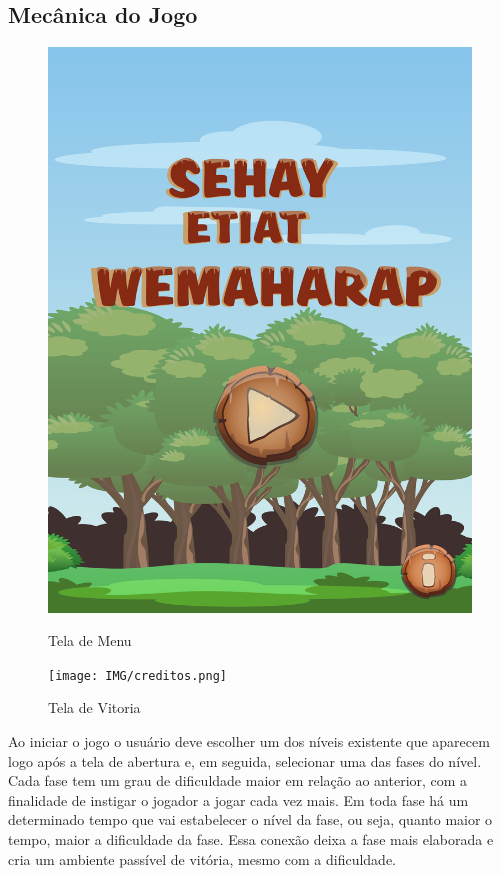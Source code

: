 \documentclass[12pt]{article}
\begin{document}
	
	\subsection{Mecânica do Jogo}
\begin{figure}[!htb]
	\centering
	\includegraphics[width=\linewidth]{IMG/menu.png}
	\caption{Tela de Menu}\label{fig:menu}
	\endminipage \hspace{0.5cm}
	\texttt{[image: IMG/creditos.png]}
	\caption{Tela de Vitoria}\label{fig:creditos}
	\endminipage
\end{figure}
		Ao iniciar o jogo o usuário deve escolher um dos níveis existente que aparecem logo após a tela de abertura e, em seguida, selecionar uma das fases do nível. Cada fase tem um grau de dificuldade maior em relação ao anterior, com a finalidade de instigar o jogador a jogar cada vez mais. Em toda fase há um determinado tempo que vai estabelecer o nível da fase, ou seja, quanto maior o tempo, maior a dificuldade da fase. Essa conexão deixa a fase mais elaborada e cria um ambiente passível de vitória, mesmo com a dificuldade. 
		
\end{document}
